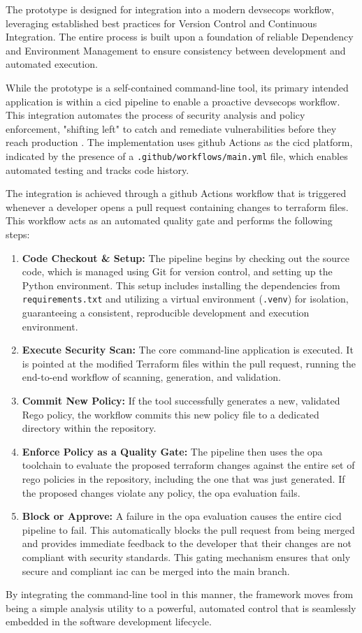 The prototype is designed for integration into a modern \gls{devsecops} workflow, leveraging established best practices for Version Control and Continuous Integration. The entire process is built upon a foundation of reliable Dependency and Environment Management to ensure consistency between development and automated execution.

While the prototype is a self-contained command-line tool, its primary intended application is within a \gls{cicd} pipeline to enable a proactive \gls{devsecops} workflow. This integration automates the process of security analysis and policy enforcement, "shifting left" to catch and remediate vulnerabilities before they reach production \cite{delicheh_mitigating_2024}. The implementation uses \gls{github} Actions as the \gls{cicd} platform, indicated by the presence of a \texttt{.github/workflows/main.yml} file, which enables automated testing and tracks code history.

The integration is achieved through a \gls{github} Actions workflow that is triggered whenever a developer opens a pull request containing changes to \gls{terraform} files. This workflow acts as an automated quality gate and performs the following steps:
\begin{enumerate}
    \item \textbf{Code Checkout \& Setup:} The pipeline begins by checking out the source code, which is managed using Git for version control, and setting up the Python environment. This setup includes installing the dependencies from \texttt{requirements.txt} and utilizing a virtual environment (\texttt{.venv}) for isolation, guaranteeing a consistent, reproducible development and execution environment.
    \item \textbf{Execute Security Scan:} The core command-line application is executed. It is pointed at the modified Terraform files within the pull request, running the end-to-end workflow of scanning, generation, and validation.
    \item \textbf{Commit New Policy:} If the tool successfully generates a new, validated Rego policy, the workflow commits this new policy file to a dedicated directory within the repository.
    \item \textbf{Enforce Policy as a Quality Gate:} The pipeline then uses the \gls{opa} toolchain to evaluate the proposed \gls{terraform} changes against the entire set of \gls{rego} policies in the repository, including the one that was just generated. If the proposed changes violate any policy, the \gls{opa} evaluation fails.
    \item \textbf{Block or Approve:} A failure in the \gls{opa} evaluation causes the entire \gls{cicd} pipeline to fail. This automatically blocks the pull request from being merged and provides immediate feedback to the developer that their changes are not compliant with security standards. This gating mechanism ensures that only secure and compliant \gls{iac} can be merged into the main branch.
\end{enumerate}
By integrating the command-line tool in this manner, the framework moves from being a simple analysis utility to a powerful, automated control that is seamlessly embedded in the software development lifecycle.

